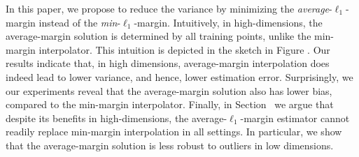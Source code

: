 In this paper, we propose to reduce the variance by minimizing the
\emph{average}-$\ell_1$-margin instead of the \emph{min}-$\ell_1$-margin.
Intuitively, in high-dimensions, the average-margin solution is determined by
all training points, unlike the min-margin interpolator. This intuition is
depicted in the sketch in Figure . Our
results indicate that, in high dimensions, average-margin interpolation does
indeed lead to lower variance, and hence, lower estimation error. Surprisingly,
we our experiments reveal that the average-margin solution also has lower bias,
compared to the min-margin interpolator.  Finally, in Section~ we argue
that despite its benefits in high-dimensions, the average-$\ell_1$-margin
estimator cannot readily replace min-margin interpolation in all settings. In
particular, we show that the average-margin solution is less robust to outliers
in low dimensions.





